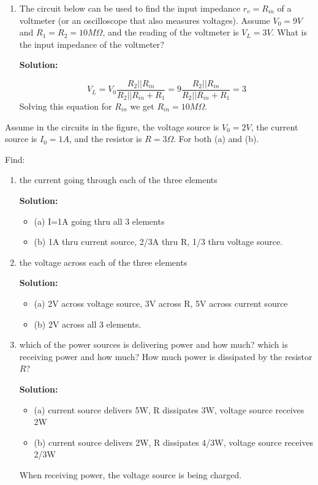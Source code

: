 \begin{enumerate}
{\bf Solution:}
\[ V_{out}=1.6\times \frac{10}{10+R_0}=1.5, \longrightarrow R_0=1.43 \Omega \]
\[ V_{out}=1.2\times \frac{10}{10+R_0}=0.3, \longrightarrow R_0=30 \Omega \]

\item The circuit below can be used to find the input impedance $r_v=R_{in}$ of
  a voltmeter (or an oscilloscope that also measures voltages). Assume $V_0=9V$
  and $R_1=R_2=10 M\Omega$, and the reading of the voltmeter is $V_L=3V$. 
  What is the input impedance of the voltmeter?
  

  {\bf Solution:}

  \[ V_L=V_0\frac{R_2||R_{in}}{R_2||R_{in}+R_1}
  =9 \frac{R_2 || R_{in}}{R_2 || R_{in}+R_1}=3 \]
  Solving this equation for $R_{in}$ we get $R_{in}=10 M\Omega$.


\end{enumerate}



\item Assume in the circuits in the figure, the voltage source is $V_0=2V$,
	the current source is $I_0=1A$, and the resistor is $R=3\Omega$.
	For both (a) and (b).


Find:
\begin{enumerate}
\item the current going through each of the three elements

{\bf Solution:}
\begin{itemize}
\item (a) I=1A going thru all 3 elements 
\item (b) 1A thru current source, 2/3A thru R, 1/3 thru voltage source.
\end{itemize}

\item the voltage across each of the three elements

{\bf Solution:}
\begin{itemize}
\item (a) 2V across voltage source, 3V across R, 5V across current source
\item (b) 2V across all 3 elements.
\end{itemize}

\item which of the power sources is delivering power and how much? which is 
	receiving power and how much? How much power is dissipated by the
	resistor $R$?

{\bf Solution:}
\begin{itemize}
\item (a) current source delivers 5W, R dissipates 3W, voltage source 
	receives 2W
\item (b) current source delivers 2W, R dissipates 4/3W, voltage source 
	receives 2/3W 
\end{itemize}
When receiving power, the voltage source is being charged.
\end{enumerate}

